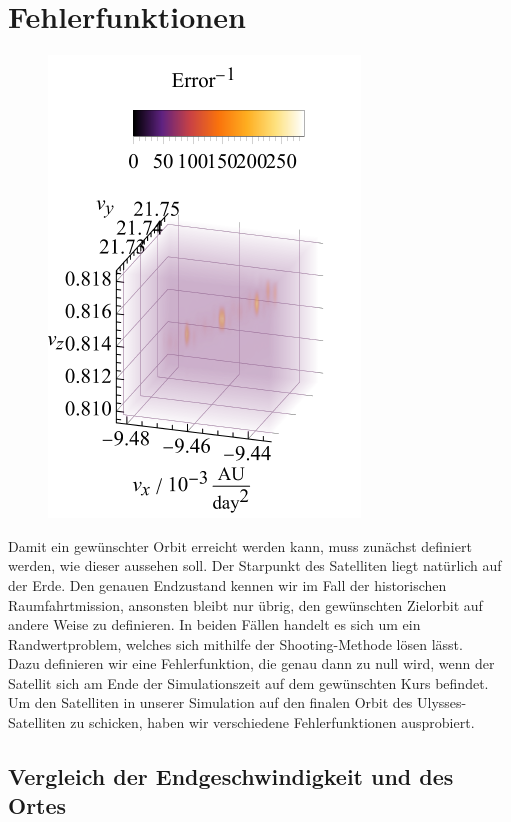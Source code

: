 \section{Fehlerfunktionen}
\begin{figure}[h!]
	\centering
	\includegraphics{img/gridSearch.pdf}
\end{figure}

Damit ein gewünschter Orbit erreicht werden kann, muss zunächst definiert werden, wie dieser aussehen soll. Der Starpunkt des Satelliten liegt natürlich auf der Erde. Den genauen Endzustand kennen wir im Fall der historischen Raumfahrtmission, ansonsten bleibt nur übrig, den gewünschten Zielorbit auf andere Weise zu definieren. In beiden Fällen handelt es sich um ein Randwertproblem, welches sich mithilfe der Shooting-Methode lösen lässt.\\
Dazu definieren wir eine Fehlerfunktion, die genau dann zu null wird, wenn der Satellit sich am Ende der Simulationszeit auf dem gewünschten Kurs befindet.
Um den Satelliten in unserer Simulation auf den finalen Orbit des Ulysses-Satelliten zu schicken, haben wir verschiedene Fehlerfunktionen ausprobiert.


\subsection{Vergleich der Endgeschwindigkeit und des Ortes}

